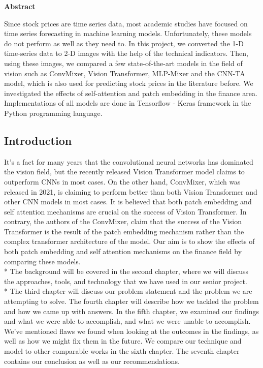 \documentclass{article}
\begin{document}
\tableofcontents

\maketitle
\begin{center}
    \textbf{\Large Abstract}
\end{center}
Since stock prices are time series data, most academic studies have focused on time series forecasting in machine learning models. Unfortunately, these models do not perform as well as they need to. In this project, we converted the 1-D time-series data to 2-D images with the help of the technical indicators. Then, using these images, we compared a few state-of-the-art models in the field of vision such as ConvMixer, Vision Transformer, MLP-Mixer and the CNN-TA model, which is also used for predicting stock prices in the literature before. We investigated the effects of self-attention and patch embedding in the finance area. Implementations of all models are done in Tensorflow - Keras framework in the Python programming language.


\begin{center}
    \section{Introduction}
\end{center}
It's a fact for many years that the convolutional neural networks has dominated the vision field, but the recently released Vision Transformer model claims to outperform CNNs in most cases. On the other hand, ConvMixer, which was released in 2021, is claiming to perform better than both Vision Transformer and other CNN models in most cases. It is believed that both patch embedding and self attention mechanisms are crucial on the success of Vision Transformer. In contrary, the authors of the ConvMixer, claim that the success of the Vision Transformer is the result of the patch embedding mechanism rather than the complex transformer architecture of the model. Our aim is to show the effects of both patch embedding and self attention mechanisms on the finance field by comparing these models. \vspace{0.2cm} \\*
The background will be covered in the second chapter, where we will discuss the approaches, tools, and technology that we have used in our senior project. \vspace{0.2cm}\\* 
The third chapter will discuss our problem statement and the problem we are attempting to solve. The fourth chapter will describe how we tackled the problem and how we came up with answers. In the fifth chapter, we examined our findings and what we were able to accomplish, and what we were unable to accomplish. We've mentioned flaws we found when looking at the outcomes in the findings, as well as how we might fix them in the future. We compare our technique and model to other comparable works in the sixth chapter. The seventh chapter contains our conclusion as well as our recommendations.
\end{document}
